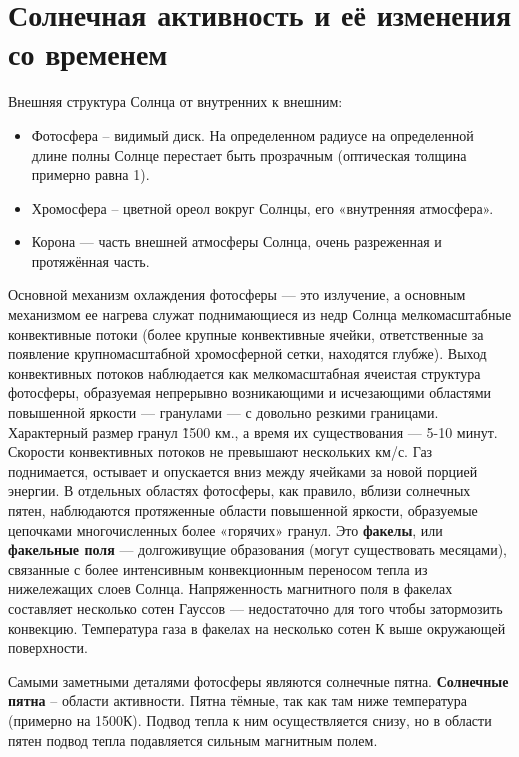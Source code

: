\section{Солнечная активность и её изменения со временем}

Внешняя структура Солнца от внутренних к внешним:

\begin{itemize}
	\item Фотосфера – видимый диск. На определенном радиусе на определенной длине полны Солнце перестает быть прозрачным (оптическая толщина примерно равна 1).
	
	\item Хромосфера – цветной ореол вокруг Солнцы, его «внутренняя атмосфера».
	
	\item Корона --- часть внешней атмосферы Солнца, очень разреженная и протяжённая часть.
\end{itemize}

Основной механизм охлаждения фотосферы --- это излучение, а основным механизмом ее нагрева служат поднимающиеся из недр Солнца мелкомасштабные конвективные потоки (более крупные конвективные ячейки, ответственные за появление крупномасштабной хромосферной сетки, находятся глубже). Выход конвективных потоков наблюдается как мелкомасштабная ячеистая структура фотосферы, образуемая непрерывно возникающими и исчезающими областями повышенной яркости — гранулами — с довольно резкими границами. Характерный размер гранул \~ 1500 км., а время их существования --- 5-10 минут. Скорости конвективных потоков не превышают нескольких км/с. Газ поднимается, остывает и опускается вниз между ячейками за новой порцией энергии. В отдельных областях фотосферы, как правило, вблизи солнечных пятен, наблюдаются протяженные области повышенной яркости, образуемые цепочками многочисленных более «горячих» гранул. Это \textbf{факелы}, или \textbf{факельные поля} — долгоживущие образования (могут существовать месяцами), связанные с более интенсивным конвекционным переносом тепла из нижележащих слоев Солнца. Напряженность магнитного поля в факелах составляет несколько сотен Гауссов — недостаточно для того чтобы затормозить конвекцию. Температура газа в факелах на несколько сотен К выше окружающей поверхности. 

Самыми заметными деталями фотосферы являются солнечные пятна. \textbf{Солнечные пятна} – области активности. Пятна тёмные, так как там ниже температура (примерно на 1500К). Подвод тепла к ним осуществляется снизу, но в области пятен подвод тепла подавляется сильным магнитным полем. 

